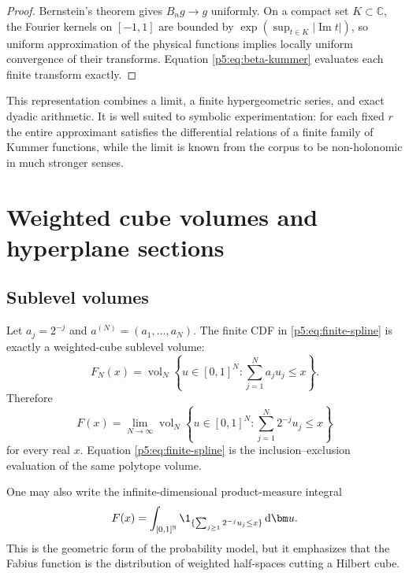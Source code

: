 \documentclass[11pt,oneside]{article}
\theoremstyle{definition}
\newcommand{\dd}{\,\mathrm d}
\newcommand{\C}{\mathbb C}
\newcommand{\N}{\mathbb N}
\begin{document}
\begin{proof}
Bernstein's theorem gives $B_ng\to g$ uniformly.  On a compact set
$K\subset\C$, the Fourier kernels on $[-1,1]$ are bounded by
$\exp(\sup_{t\in K}|\operatorname{Im}t|)$, so uniform approximation of the
physical functions implies locally uniform convergence of their transforms.
Equation \eqref{p5:eq:beta-kummer} evaluates each finite transform exactly.
\end{proof}

This representation combines a limit, a finite hypergeometric series, and
exact dyadic arithmetic.  It is well suited to symbolic experimentation:
for each fixed $r$ the entire approximant satisfies the differential
relations of a finite family of Kummer functions, while the limit is known
from the corpus to be non-holonomic in much stronger senses.

\section{Weighted cube volumes and hyperplane sections}
\label{p5:sec:cube}

\subsection{Sublevel volumes}

Let $a_j=2^{-j}$ and $a^{(N)}=(a_1,\ldots,a_N)$.  The finite CDF in
\eqref{p5:eq:finite-spline} is exactly a weighted-cube sublevel volume:
\begin{equation}
 \boxed{\displaystyle
 F_N(x)=\operatorname{vol}_N
 \left\{u\in[0,1]^N:\sum_{j=1}^{N}a_ju_j\le x\right\}.} \label{p5:eq:cube-sublevel}
\end{equation}
Therefore
\begin{equation}
 \boxed{\displaystyle
 F(x)=\lim_{N\to\infty}\operatorname{vol}_N
 \left\{u\in[0,1]^N:\sum_{j=1}^{N}2^{-j}u_j\le x\right\}}              \label{p5:eq:cube-volume-limit}
\end{equation}
for every real $x$.  Equation \eqref{p5:eq:finite-spline} is the
inclusion--exclusion evaluation of the same polytope volume.

One may also write the infinite-dimensional product-measure integral
\begin{equation}
 F(x)=\int_{[0,1]^\N}
 \1_{\{\sum_{j\ge1}2^{-j}u_j\le x\}}\dd\bm u.           \label{p5:eq:infinite-cube-integral}
\end{equation}
This is the geometric form of the probability model, but it emphasizes that
the Fabius function is the distribution of weighted half-spaces cutting a
Hilbert cube.
\end{document}
